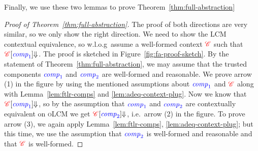 \documentclass[acmsmall,review,showframe]{acmart}\settopmatter{printfolios=true,printccs=false,printacmref=false}
\renewcommand{\comp}{\var{comp}}
\newcommand{\trgcm}{\textsc{LCM}}
\newcommand{\srccm}{\textsc{oLCM}}
\begin{document}
Finally, we use these two lemmas to prove Theorem~\ref{thm:full-abstraction}
\begin{proof}[Proof of Theorem~\ref{thm:full-abstraction}]
  The proof of both directions are very similar, so we only show the right direction.
  We need to show the \trgcm{} contextual equivalence, so w.l.o.g\ assume a well-formed context ${\color{red} \mathscr{C}}$ such that ${\plug{\trg{\context}}{\src{\comp_1}} \term[]{}}$.
  The proof is sketched in Figure~\ref{fig:fa-proof-sketch}.
  By the statement of Theorem~\ref{thm:full-abstraction}, we may assume that the trusted components $\src{\comp_1}$ and $\src{\comp_2}$ are well-formed and reasonable.
  We prove arrow (1) in the figure by using the mentioned assumptions about $\src{\comp_1}$ and ${\color{red} \mathscr{C}}$ along with Lemma~\ref{lem:ftlr-comps} and \ref{lem:adeq-context-plug}.
  Now we know that ${\plug{\trg{\context}}{\src{\comp_1}} \sterm[]{}{}}$, so by the assumption that $\src{\comp_1}$ and $\src{\comp_2}$ are contextually equivalent on \srccm{} we get ${\plug{\trg{\context}}{\src{\comp_2}} \sterm[]{}{}}$, i.e.\ arrow (2) in the figure.
  To prove arrow (3), we again apply Lemma~\ref{lem:ftlr-comps}, \ref{lem:adeq-context-plug}; but this time, we use the assumption that $\src{\comp_2}$ is well-formed and reasonable and that ${\color{red} \mathscr{C}}$ is well-formed.
\end{proof}
\end{document}
